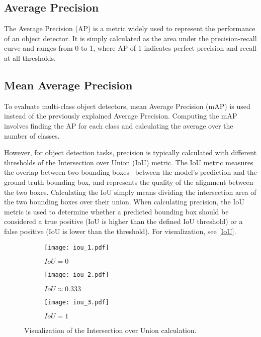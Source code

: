 \subsection*{Average Precision}

The Average Precision (AP) is a metric widely used to represent the performance
of an object detector. It is simply calculated as the area under the
precision-recall curve and ranges from 0 to 1, where AP of 1 indicates perfect
precision and recall at all thresholds.

\subsection*{Mean Average Precision}

To evaluate multi-class object detectors, mean Average Precision (mAP) is used
instead of the previously explained Average Precision. Computing the mAP
involves finding the AP for each class and calculating the average over the
number of classes.

However, for object detection tasks, precision is typically calculated with
different thresholds of the Intersection over Union (IoU) metric. The IoU metric
measures the overlap between two bounding boxes\,--\,between the model's
prediction and the ground truth bounding box, and represents the quality of the
alignment between the two boxes. Calculating the IoU simply means dividing the
intersection area of the two bounding boxes over their union. When calculating
precision, the IoU metric is used to determine whether a predicted bounding box
should be considered a true positive (IoU is higher than the defined IoU
threshold) or a false positive (IoU is lower than the threshold). For
visualization, see \autoref{IoU}.

\begin{figure}[h]
    \centering
    \begin{subfigure}[b]{0.3125\textwidth}
        \texttt{[image: iou\_1.pdf]}
        \caption{$IoU = 0$}
    \end{subfigure}
    \hfill
    \begin{subfigure}[b]{0.2272727\textwidth}
        \texttt{[image: iou\_2.pdf]}
        \caption{$IoU \approx 0.333$}
    \end{subfigure}
    \hfill
    \begin{subfigure}[b]{0.15151515\textwidth}
        \texttt{[image: iou\_3.pdf]}
        \caption{$IoU = 1$}
    \end{subfigure}

    \caption{Visualization of the Intersection over Union calculation.}
    \label{IoU}
\end{figure}

